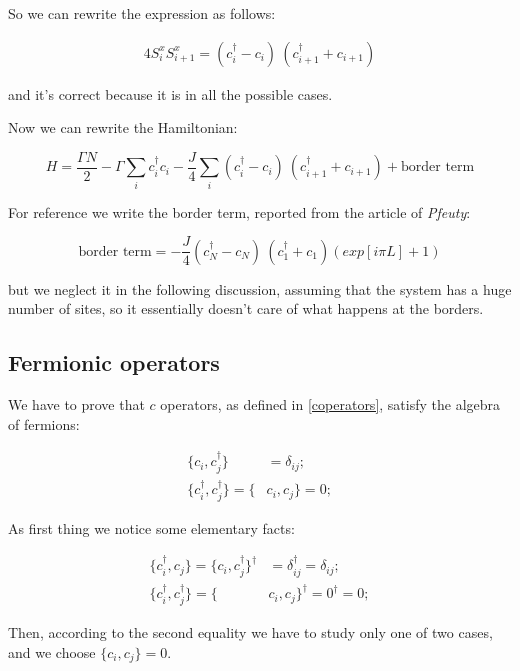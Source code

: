 \noindent So we can rewrite the expression as follows:

\begin{align*}
4 S_i^x S_{i+1}^x = (c_i^\dagger - c_i)~(c_{i+1}^\dagger + c_{i+1})
\end{align*}

\noindent and it's correct because it is in all the possible cases.

Now we can rewrite the Hamiltonian:

\begin{equation}
H = \frac{\Gamma N}{2} - \Gamma \sum_i c_i^\dagger c_i - \frac{J}{4} \sum_i (c_i^\dagger - c_i)~(c_{i+1}^\dagger + c_{i+1}) + \text{border term}
\end{equation}

\noindent For reference we write the border term, reported from the article of \textit{Pfeuty}:

\begin{equation}
\text{border term} = - \frac{J}{4} (c_N^\dagger - c_N)~(c_{1}^\dagger + c_{1})(exp[i \pi L] + 1)
\end{equation}

\noindent but we neglect it in the following discussion, assuming that the system has a huge number of sites, so it essentially doesn't care of what happens at the borders.

\subsection{Fermionic operators}
\label{fermiops}

We have to prove that $c$ operators, as defined in \cref{coperators}, satisfy the algebra of fermions:

\begin{align*}
\{c_i, c_j^\dagger\} &= \delta_{ij};\\
\{c_i^\dagger, c_j^\dagger\} = \{&c_i, c_j\} = 0;
\end{align*}

As first thing we notice some elementary facts:

\begin{align*}
\{c_i^\dagger, c_j\} = \{c_i, c_j^\dagger\}^\dagger &= \delta_{ij}^\dagger = \delta_{ij};\\
\{c_i^\dagger, c_j^\dagger\} = \{&c_i, c_j\}^\dagger = 0^\dagger = 0;
\end{align*}

\noindent Then, according to the second equality we have to study only one of two cases, and we choose $ \{c_i, c_j\} = 0$.

